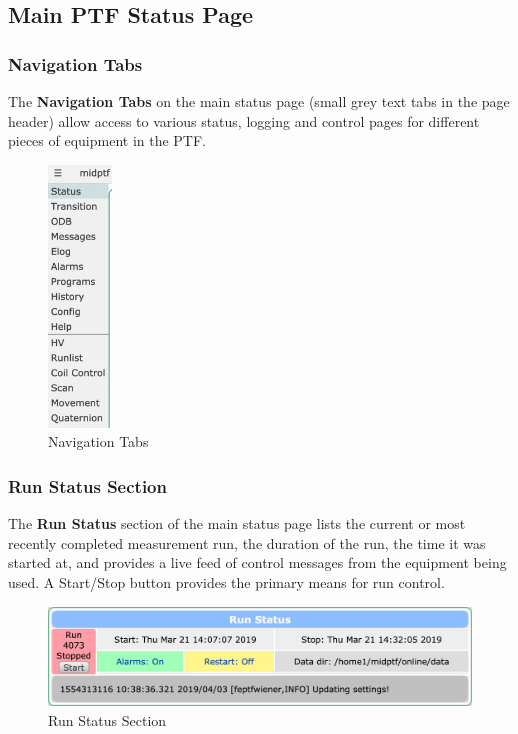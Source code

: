 \documentclass[twoside,letterpaper]{refart}
\begin{document}
\clearpage

\subsection{Main PTF Status Page}

\subsubsection{Navigation Tabs} The \textbf{Navigation Tabs} on the main status page (small grey text tabs in the page header) allow access to various status, logging and control pages for different pieces of equipment in the PTF.

\FloatBarrier

\begin{figure}[!htpb]\centering	
	\includegraphics[width=0.15\textwidth]{images/navTabs.png}
	\caption{Navigation Tabs\label{navTabs}}
\end{figure}

\FloatBarrier

\subsubsection{Run Status Section}

The \textbf{Run Status} section of the main status page lists the current or most recently completed measurement run, the duration of the run, the time it was started at, and provides a live feed of control messages from the equipment being used. A Start/Stop button provides the primary means for run control.

\FloatBarrier

\begin{figure}[!htpb]\centering	
	\includegraphics[width=\textwidth]{images/runStatus.png}
	\caption{Run Status Section\label{runStatus}}
\end{figure}
\end{document}
